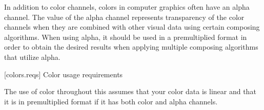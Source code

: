 \pnum
In addition to color channels, colors in computer graphics often have an alpha channel. The value of the alpha channel represents transparency of the color channels when they are combined with other visual data using certain composing algorithms. When using alpha, it should be used in a premultiplied format in order to obtain the desired results when applying multiple composing algorithms that utilize alpha.

 [colors.reqs] {Color usage requirements}

\pnum
The use of color throughout this \documenttypename assumes that your color data is linear and that it is in premultiplied format if it has both color and alpha channels.

\addtocounter{SectionDepthBase}{1}


\addtocounter{SectionDepthBase}{-1}
